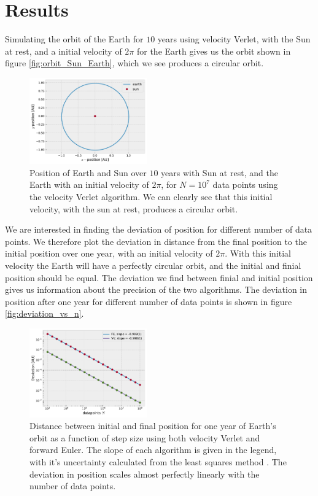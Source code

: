 \documentclass[%
 reprint,
nofootinbib,
aps,
]{revtex4-1}
\begin{document}
\section{Results}
Simulating the orbit of the Earth for $10$ years using velocity Verlet, with the Sun at rest, and a initial velocity of $2\pi$ for the Earth gives us the orbit shown in figure \vref{fig:orbit_Sun_Earth}, which we see produces a circular orbit.

\begin{figure}
  \centering
  \includegraphics[width=0.45\textwidth]{../figures/eart_sun_orbit.pdf}
  \caption{Position of Earth and Sun over $10$ years with Sun at rest, and the Earth with an initial velocity of $2\pi$, for $N=10^{7}$ data points using the velocity Verlet algorithm. We can clearly see that this initial velocity, with the sun at rest, produces a circular orbit.}
  \label{fig:orbit_Sun_Earth}
\end{figure}

We are interested in finding the deviation of position for different number of data points. We therefore plot the deviation in distance from the final position to the initial position over one year, with an initial velocity of $2\pi$. With this initial velocity the Earth will have a perfectly circular orbit, and the initial and finial position should be equal. The deviation we find between finial and initial position gives us information about the precision of the two algorithms. The deviation in position after one year for different number of data points is shown in figure \vref{fig:deviation_vs_n}.

\begin{figure}
  \centering
  \includegraphics[width=0.45\textwidth]{../figures/deviation_vs_n.pdf}
  \caption{Distance between initial and final position for one year of Earth's orbit as a function of step size using both velocity Verlet and forward Euler. The slope of each algorithm is given in the legend, with it's uncertainty calculated from the least squares method \cite{Squires}. The deviation in position scales almost perfectly linearly with the number of data points.}
  \label{fig:deviation_vs_n}
\end{figure}
\end{document}
